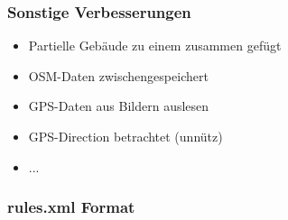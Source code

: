 \begin{frame}
  \frametitle{Sonstige Verbesserungen}
  \begin{itemize}
    \item Partielle Gebäude zu einem zusammen gefügt
    \item OSM-Daten zwischengespeichert
    \item GPS-Daten aus Bildern auslesen
    \item GPS-Direction betrachtet (unnütz)
    \item ...
  \end{itemize}
\end{frame}

\begin{frame}[fragile]
  \frametitle{rules.xml Format}
  \lstset{language=XML,basicstyle=\scriptsize}
  
\end{frame}
